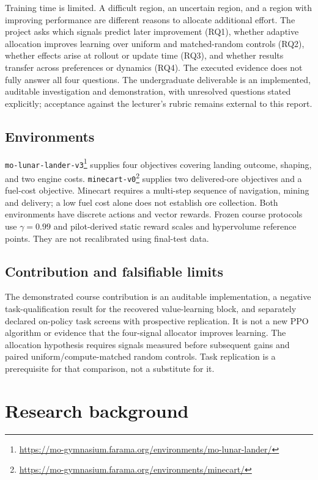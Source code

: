 Training time is limited. A difficult region, an uncertain region, and a region
with improving performance are different reasons to allocate additional effort.
The project asks which signals predict later improvement (RQ1), whether adaptive
allocation improves learning over uniform and matched-random controls (RQ2),
whether effects arise at rollout or update time (RQ3), and whether results
transfer across preferences or dynamics (RQ4). The executed evidence does not
fully answer all four questions. The undergraduate deliverable is an implemented,
auditable investigation and demonstration, with unresolved questions stated
explicitly; acceptance against the lecturer's rubric remains external to this report.

\subsection{Environments}
\texttt{mo-lunar-lander-v3}\footnote{\url{https://mo-gymnasium.farama.org/environments/mo-lunar-lander/}}
supplies four objectives covering landing outcome,
shaping, and two engine costs. \texttt{minecart-v0}\footnote{\url{https://mo-gymnasium.farama.org/environments/minecart/}}
supplies two delivered-ore
objectives and a fuel-cost objective. Minecart requires a multi-step sequence
of navigation, mining and delivery; a low fuel cost alone does not establish
ore collection. Both environments have discrete actions and vector rewards.
Frozen course protocols use $\gamma=0.99$ and pilot-derived static reward scales
and hypervolume reference points. They are not recalibrated using final-test data.

\subsection{Contribution and falsifiable limits}
The demonstrated course contribution is an auditable implementation, a negative
task-qualification result for the recovered value-learning block, and separately
declared on-policy task screens with prospective replication. It is not a new
PPO algorithm or evidence that the four-signal allocator improves learning.
The allocation hypothesis requires signals measured before subsequent gains
and paired uniform/compute-matched random controls. Task replication is a
prerequisite for that comparison, not a substitute for it.

\section{Research background}

